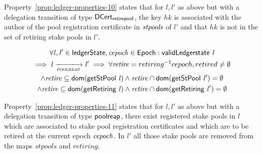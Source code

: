 Property~\ref{prop:ledger-properties-10} states that for $l, l'$ as above but
with a delegation transition of type $\mathsf{DCert_{retirepool}}$, the key $hk$ is
associated with the author of the pool registration certificate in
$\mathit{stpools}$ of $l'$ and that $hk$ is not in the set of retiring stake pools
in $l'$.

\begin{property}
  \begin{multline*}
    \forall \var{l}, \var{l'} \in \ledgerState, \var{cepoch} \in \Epoch:
    \applyFun{validLedgerstate}{l} \\
    \implies \var{l} \trans{poolreap}{} \var{l'} \implies \forall \var{retire} =
    retiring^{-1} cepoch, retired \neq \emptyset \\ \wedge \var{retire}
    \subseteq \fun{dom}(\applyFun{getStPool}{l}) \wedge
    \var{retire} \cap \fun{dom}(\applyFun{getStPool}{l'}) = \emptyset \\
    \wedge \var{retire} \subseteq \fun{dom}(\applyFun{getRetiring}{l}) \wedge
    \var{retire} \cap \fun{dom}(\applyFun{getRetiring}{l'}) = \emptyset
  \end{multline*}
  \label{prop:ledger-properties-11}
\end{property}

Property~\ref{prop:ledger-properties-11} states that for $l, l'$ as above but
with a delegation transition of type $\mathsf{poolreap}$, there exist registered stake
pools in $l$ which are associated to stake pool registration certificates and
which are to be retired at the current epoch $\mathit{cepoch}$. In $l'$ all those
stake pools are removed from the maps $stpools$ and $retiring$.

